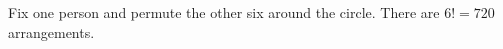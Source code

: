 Fix one person and permute the other six around the circle. There are $6!=\boxed{720}$ arrangements.
